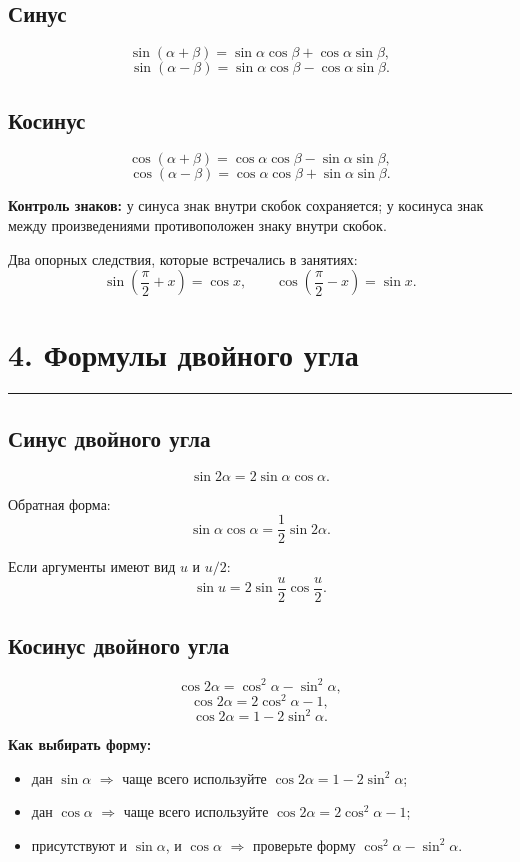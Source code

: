 \documentclass[a4paper,12pt]{article}
\newcommand{\sectionline}{\vspace{-1mm}\noindent\color{accent}\rule{\linewidth}{0.7pt}\color{textgray}\vspace{2mm}}
\newcommand{\key}[1]{\textbf{\color{darkaccent}#1}}
\begin{document}
\subsection*{Синус}
\[
\boxed{\sin(\alpha+\beta)=\sin\alpha\cos\beta+\cos\alpha\sin\beta},
\]
\[
\boxed{\sin(\alpha-\beta)=\sin\alpha\cos\beta-\cos\alpha\sin\beta}.
\]

\subsection*{Косинус}
\[
\boxed{\cos(\alpha+\beta)=\cos\alpha\cos\beta-\sin\alpha\sin\beta},
\]
\[
\boxed{\cos(\alpha-\beta)=\cos\alpha\cos\beta+\sin\alpha\sin\beta}.
\]

\key{Контроль знаков:} у синуса знак внутри скобок сохраняется; у косинуса знак между произведениями противоположен знаку внутри скобок.

Два опорных следствия, которые встречались в занятиях:
\[
\boxed{\sin\left(\frac\pi2+x\right)=\cos x},
\qquad
\boxed{\cos\left(\frac\pi2-x\right)=\sin x}.
\]

\section*{4. Формулы двойного угла}
\sectionline

\subsection*{Синус двойного угла}
\[
\boxed{\sin2\alpha=2\sin\alpha\cos\alpha}.
\]

Обратная форма:
\[
\boxed{\sin\alpha\cos\alpha=\frac12\sin2\alpha}.
\]

Если аргументы имеют вид $u$ и $u/2$:
\[
\boxed{\sin u=2\sin\frac u2\cos\frac u2}.
\]

\subsection*{Косинус двойного угла}
\[
\boxed{\cos2\alpha=\cos^2\alpha-\sin^2\alpha},
\]
\[
\boxed{\cos2\alpha=2\cos^2\alpha-1},
\]
\[
\boxed{\cos2\alpha=1-2\sin^2\alpha}.
\]

\key{Как выбирать форму:}
\begin{itemize}
  \item дан $\sin\alpha$ $\Rightarrow$ чаще всего используйте $\cos2\alpha=1-2\sin^2\alpha$;
  \item дан $\cos\alpha$ $\Rightarrow$ чаще всего используйте $\cos2\alpha=2\cos^2\alpha-1$;
  \item присутствуют и $\sin\alpha$, и $\cos\alpha$ $\Rightarrow$ проверьте форму $\cos^2\alpha-\sin^2\alpha$.
\end{itemize}
\end{document}
